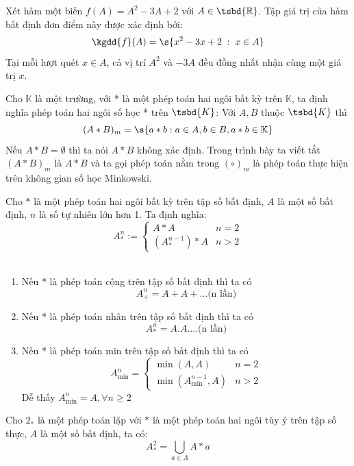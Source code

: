 \begin{example}
	Xét hàm một biến $f(A) = A^2 - 3A + 2$ với $A \in \tsbd{\mathbb{R}}$. Tập giá trị của hàm bất định đơn điểm này được xác định bởi:
	\[
	\kgdd{f}(A) = \s{x^2 - 3x + 2 \;:\; x \in A}
	\]
	Tại mỗi lượt quét $x \in A$, cả vị trí $A^2$ và $-3A$ đều đồng nhất nhận cùng một giá trị $x$.
\end{example}
\begin{definition}
	Cho $ \mathbb{K}$ là một trường, với * là một phép toán hai ngôi bất kỳ trên $\mathbb{K}$, ta định nghĩa phép toán hai ngôi số học * trên $\tsbd{K}$:
	Với $A,B$ thuộc $\tsbd{K}$ thì $$(A * B)_m = \s{a*b : a \in A , b\in B , a*b \in \mathbb{K}}$$
	\noindent Nếu $A * B =\emptyset$ thì ta nói $A * B$ không xác định. Trong trình bày ta viết tắt $(A*B)_m$ là $A*B$ và ta gọi phép toán nằm trong $(\circ)_m$ là phép toán thực hiện trên không gian số học Minkowski.
\end{definition}
\begin{definition}
	Cho $*$ là một phép toán hai ngôi bất kỳ trên tập số bất định, $A$ là một số bất định, $n$ là số tự nhiên lớn hơn 1. Ta định nghĩa: $$A^{n}_{*} := \begin{cases}
		A*A                         & n=2   \\
		\left(A^{n-1}_*\right)  * A & n > 2
	\end{cases}
	$$\
\end{definition}
\begin{example}
	\begin{enumerate}
		\item Nếu * là phép toán cộng trên tập số bất định thì ta có $$A^n_+ = A+A+... \text{(n lần)}$$
		\item Nếu * là phép toán nhân trên tập số bất định thì ta có $$A^n_* = A.A ....  \text{(n lần)}$$
		\item Nếu * là phép toán min trên tập số bất định thì ta có
		$$A^n_{\min} =  \begin{cases}
			\min(A,A)                          & n=2   \\
			\min\left(A^{n-1}_{\min}, A\right) & n > 2
		\end{cases} $$
		Dễ thấy $A^n_{\min} = A, \forall n \geq 2$
	\end{enumerate}
\end{example}
\begin{example}
	Cho $2_*$ là một phép toán lặp với $*$ là một phép toán hai ngôi tùy ý trên tập số thực, $A$ là một số bất định, ta có:
	\[A^2_* = \bigcup_{a \in A} A * a \]
\end{example}
